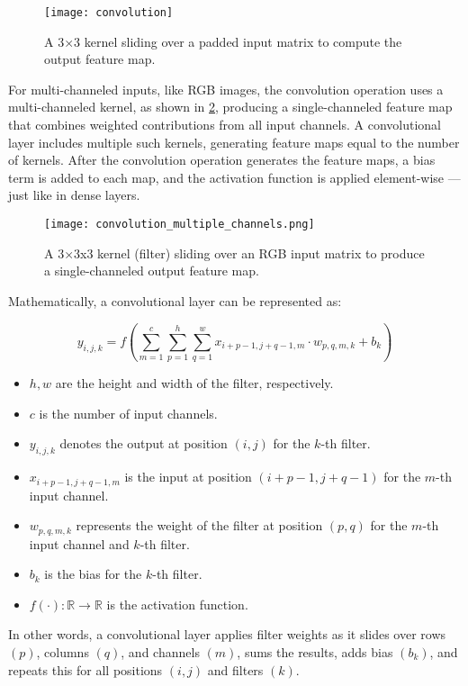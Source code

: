\begin{figure}[t!]
  \centering
  \texttt{[image: convolution]}
  \caption{A 3×3 kernel sliding over a padded input matrix to compute the output feature map.}
  \label{fig:convolution}
\end{figure}

For multi-channeled inputs, like RGB images, the convolution operation uses a multi-channeled kernel, as shown in \cref{fig:convolution_multiple_channels}, 
producing a single-channeled feature map that combines weighted contributions from all input channels. 
A convolutional layer includes multiple such kernels, generating feature maps equal to the number of kernels.
After the convolution operation generates the feature maps, a bias term is added to each map, 
and the activation function is applied element-wise — just like in dense layers.

\begin{figure}[h!]
  \centering
  \texttt{[image: convolution\_multiple\_channels.png]}
  \caption{A 3×3x3 kernel (filter) sliding over an RGB input matrix to produce a single-channeled output feature map.}
  \label{fig:convolution_multiple_channels}
\end{figure}

Mathematically, a convolutional layer can be represented as:

\[
y_{i,j,k} = f \left( \sum_{m=1}^c \sum_{p=1}^h \sum_{q=1}^w x_{i+p-1, j+q-1, m} \cdot w_{p,q,m,k} + b_k \right)
\]

\begin{itemize}
  \item \( h, w \) are the height and width of the filter, respectively.
  \item \( c \) is the number of input channels.
  \item \( y_{i,j,k} \) denotes the output at position \((i, j)\) for the \(k\)-th filter.
  \item \( x_{i+p-1, j+q-1, m} \) is the input at position \((i+p-1, j+q-1)\) for the \(m\)-th input channel.
  \item \( w_{p,q,m,k} \) represents the weight of the filter at position \((p, q)\) for the \(m\)-th input channel and \(k\)-th filter.
  \item \( b_k \) is the bias for the \(k\)-th filter.
  \item \( f(\cdot): \mathbb{R} \to \mathbb{R} \) is the activation function.
\end{itemize}

In other words, a convolutional layer applies filter weights 
as it slides over rows \((p)\), columns \((q)\), and channels \((m)\), 
sums the results, adds bias \((b_k)\), 
and repeats this for all positions \((i, j)\) and filters \((k)\).

